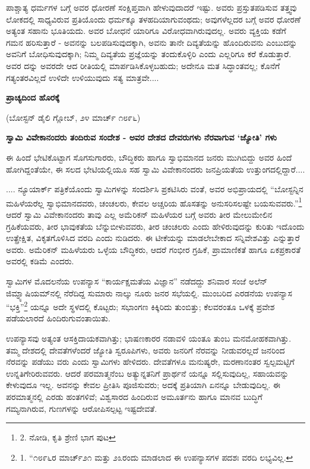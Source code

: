 ಪಾಶ್ಚಾತ್ಯ ಧರ್ಮಗಳ ಬಗ್ಗೆ ಅವರ ಧೋರಣೆ ಸಂಕ್ಷಿಪ್ತವಾಗಿ ಹೇಳುವುದಾದರೆ ಇಷ್ಟು. ಅವರು ಪ್ರಸ್ತುತಪಡಿಸುವ ತತ್ತ್ವವು ಲೋಕದಲ್ಲಿ ಸಾಧ್ಯವಿರುವ ಪ್ರತಿಯೊಂದು ಧರ್ಮಕ್ಕೂ ತಳಹದಿಯಾಗುವಂಥದು; ಅವುಗಳೆಲ್ಲದರ ಬಗ್ಗೆ ಅವರ ಧೋರಣೆ ಅತ್ಯಂತ ಸಹಾನು ಭೂತಿಯದು. ಅವರ ಬೋಧನೆ ಯಾರಿಗೂ ವಿರೋಧವಾಗಿರುವುದಲ್ಲ. ಅವರು ವ್ಯಕ್ತಿಯ ಕಡೆಗೆ ಗಮನ ಹರಿಸುತ್ತಾರೆ - ಅವನನ್ನು ಬಲಪಡಿಸುವುದಕ್ಕಾಗಿ, ಅವನು ತಾನೇ ದಿವ್ಯತೆಯನ್ನು ಹೊಂದಿರುವನು ಎಂಬುದನ್ನು ಅವನಿಗೆ ಬೋಧಿಸುವುದಕ್ಕಾಗಿ; ನಿಮ್ಮ ದಿವ್ಯತೆಯ ಪ್ರಜ್ಞೆಯನ್ನು ತಂದುಕೊಳ್ಳಿರಿ ಎಂದು ಎಲ್ಲರಿಗೂ ಕರೆ ಕೊಡುತ್ತಾರೆ. ಅವರ ದನ್ನು ಅವರದೇ ಆದ ರೀತಿಯಲ್ಲಿ ಮಾರ್ಪಡಿಸಿಕೊಳ್ಳಬಹುದು; ಅದೇನೂ ಮತ ಸಿದ್ಧಾಂತವಲ್ಲ; ಕೊನೆಗೆ ಗತ್ಯಂತರವಿಲ್ಲದೆ ಉಳಿದೇ ಉಳಿಯುವುದು ಸತ್ಯ ಮಾತ್ರವೇ....

\begin{center}
\textbf{ಪ್ರಾಚ್ಯದಿಂದ ಹೊರಕ್ಕೆ}
\end{center}

\begin{center}
(ಬೋಸ್ಟನ್ ಡೈಲಿ ಗ್ಲೋಬ್, ೨೪ ಮಾರ್ಚ್ ೧೮೯೬)
\end{center}

\begin{center}
\textbf{ಸ್ವಾಮಿ ವಿವೇಕಾನಂದರು ತಂದಿರುವ ಸಂದೇಶ - ಅವರ ದೇಶದ ದೇವರುಗಳು ನೆರವಾಗುವ ‘ಜ್ಯೋತಿ’ ಗಳು}
\end{center}

ಈ ಹಿಂದೆ ಭೇಟಿಕೊಟ್ಟಾಗ ಸೊಗಸುಗಾರರು, ಬೌದ್ಧಿಕರು ಹಾಗೂ ಸ್ವಾಭಿಮಾನದ ಜನರು ಮುಗಿಬಿದ್ದು ಅವರ ಹಿಂದೆ ಹೋಗಿದ್ದಂತೆಯೇ, ಈ ಸಲದ ಭೇಟಿಯಲ್ಲಿಯೂ ಸಹ ಸ್ವಾಮಿ ವಿವೇಕಾನಂದರು ಜನಪ್ರಿಯತೆಯ ಉತ್ತುಂಗದಲ್ಲಿದ್ದಾರೆ....

.... ನ್ಯೂಯಾರ್ಕ್ ಪತ್ರಿಕೆಯೊಂದು ಸ್ವಾಮಿಗಳನ್ನು ಸಂದರ್ಶಿಸಿ ಪ್ರಕಟಿಸಿರು ವಂತೆ, ಅವರ ಅಭಿಪ್ರಾಯದಲ್ಲಿ “ಬೋಸ್ಟನ್ನಿನ ಮಹಿಳೆಯರೆಲ್ಲ ಸ್ವಾಭಿಮಾನದವರು, ಚಂಚಲರು, ಕೇವಲ ಅಚ್ಚರಿಯ ಹೊಸತನ್ನು ಅನುಸರಿಸಲಷ್ಟೇ ಬಯಸುವವರು.”\footnote{2. ನೋಡಿ, ಕೃತಿ ಶ್ರೇಣಿ ಭಾಗ  ಪುಟ } ಆದರೆ ಸ್ವಾಮಿ ವಿವೇಕಾನಂದರು ತಾವು ಎಲ್ಲ ಅಮೆರಿಕನ್ ಮಹಿಳೆಯರ ಬಗ್ಗೆ ಅವರು ತೀರ ಮೇಲುಮೇಲಿನ ಗ್ರಹಿಕೆಯವರು, ತೀರ ಭಾವುಕತೆಯ ಬೆನ್ನುಬೀಳುವವರು, ತೀರ ಚಂಚಲರು ಎಂದು ಹೇಳಿರುವುದನ್ನು ಕುರಿತು ಇದೊಂದು ಉತ್ಪ್ರೇಕ್ಷಿತ, ವಿಕೃತಗೊಳಿಸಿದ ವರದಿ ಎಂದು ನುಡಿದರು. ಈ ಟೀಕೆಯನ್ನು ಮಾಡಲೇಬೇಕಾದ ಸನ್ನಿವೇಶವಿತ್ತು ಎನ್ನುತ್ತಾರೆ ಅವರು. ಅಮೆರಿಕನ್ ಮಹಿಳೆಯರು ಒಳ್ಳೆಯ ಬೌದ್ಧಿಕರು, ಆದರೆ ಗಂಭೀರ ಗ್ರಹಿಕೆ, ಪ್ರಾಮಾಣಿಕತೆ ಹಾಗೂ ಏಕಪ್ರಕಾರತೆ ಅವರಲ್ಲಿ ಕಡಿಮೆ ಎಂದರು.

ಸ್ವಾಮಿಗಳ ಮೊದಲನೆಯ ಉಪನ್ಯಾಸ “ಕಾರ್ಯಕ್ಷಮತೆಯ ವಿಜ್ಞಾನ” ನಡೆದದ್ದು ಶನಿವಾರ ಸಂಜೆ ಅಲೆನ್ ಜಿಮ್ನ್ಯಾಷಿಯಮ್​ನಲ್ಲಿ ನೆರೆದಿದ್ದ ಸುಮಾರು ನಾಲ್ಕು ನೂರು ಜನರ ಸಭೆಯಲ್ಲಿ. ಮುಂಬರಿದ ಎರಡನೆಯ ಉಪನ್ಯಾಸ “ಭಕ್ತಿ”\footnote{1. “೧೮೯೬ರ ಮಾರ್ಚ್೨೧ ಮತ್ತು ೨೩ರಂದು ಮಾಡಲಾದ ಈ ಉಪನ್ಯಾಸಗಳ ಪದಶಃ ವರದಿ ಲಭ್ಯವಿಲ್ಲ.} ಯನ್ನೂ ಅದೇ ಸ್ಥಳದಲ್ಲಿ ಕೊಟ್ಟರು; ಸಭಾಂಗಣ ಕಿಕ್ಕಿರಿದು ತುಂಬಿತ್ತು; ಕೆಲವರಂತೂ ಒಳಕ್ಕೆ ಪ್ರವೇಶ ಪಡೆಯಲಾರದೆ ಹಿಂದಿರುಗುವಂತಾಯಿತು.

ಉಪನ್ಯಾಸವು ಅತ್ಯಂತ ಆಸಕ್ತಿದಾಯಕವಾಗಿತ್ತು; ಭಾಷಣಕಾರರ ನಡಾವಳಿ ಯಂತೂ ತುಂಬ ಮನಮೋಹಕವಾಗಿತ್ತು. ತಮ್ಮ ದೇಶದಲ್ಲಿ ದೇವತೆಗಳೆಂದರೆ ಜ್ಯೋತಿ ಸ್ವರೂಪಿಗಳು, ಅವರು ಜನರಿಗೆ ನೆರವನ್ನು ನೀಡುವರಲ್ಲದೆ ಜನರಿಂದ ನೆರವನ್ನು ಪಡೆಯು ವರು ಎಂದು ಸ್ವಾಮಿಗಳು ಹೇಳಿದರು. ದೇವತೆಗಳೂ ಮನುಷ್ಯರೇ, ಮರಣಾನಂತರ ಸ್ವಲ್ಪಮಟ್ಟಿಗೆ ಉನ್ನತಿಗೇರಿರುವವರು. ಆದರೆ ಪರಮಾತ್ಮನೆಂಬ ಅತ್ಯುನ್ನತನಿಗೆ ಪ್ರಾರ್ಥನೆ ಯನ್ನೂ ಸಲ್ಲಿಸುವುದಿಲ್ಲ, ಸಹಾಯವನ್ನು ಕೇಳುವುದೂ ಇಲ್ಲ. ಅವನನ್ನು ಕೇವಲ ಪ್ರೀತಿಸಿ ಪೂಜಿಸುವರು; ಅದಕ್ಕೆ ಪ್ರತಿಯಾಗಿ ಏನನ್ನೂ ಬೇಡುವುದಿಲ್ಲ. ಈ ಪರಮಾತ್ಮನಲ್ಲಿ ಎರಡು ಹಂತಗಳಿವೆ; ವಿಶ್ವಸಾರದ ಹಿಂದಿರುವ ಅಮೂರ್ತನು ಹಾಗೂ ಮಾನವ ಬುದ್ಧಿಗೆ ಗಮ್ಯನಾಗಿರುವ, ಗುಣಗಳನ್ನು ಆರೋಪಿಸಲ್ಪಟ್ಟ ಇಷ್ಟದೇವತೆ.


